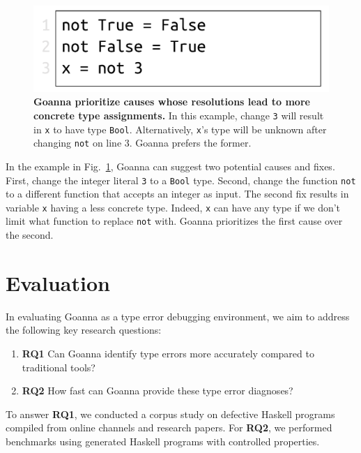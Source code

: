 \documentclass[pdflatex,lineno,sn-nature,Numbered]{sn-jnl}%
\begin{document}
	
   \begin{figure}[ht!]
        \centering
        \includegraphics[width=0.5\linewidth]{images/Specificity}
        \caption[Goanna prioritize causes whose resolutions lead to more concrete type assignments]{\textbf{Goanna prioritize causes whose resolutions lead to more concrete type assignments.} In this example, change \texttt{3} will result in \texttt{x} to have type \texttt{Bool}. Alternatively, \texttt{x}'s type will be unknown after changing \texttt{not} on line 3. Goanna prefers the former.} 
        \label{fig:specificity}
    \end{figure}

    In the example in Fig.~\ref{fig:specificity}, Goanna can suggest two potential causes and fixes. First, change the integer literal \texttt{3} to a \texttt{Bool} type. Second, change the function \texttt{not} to a different function that accepts an integer as input. The second fix results in variable \texttt{x} having a less concrete type. Indeed, \texttt{x} can have any type if we don't limit what function to replace \texttt{not} with. Goanna prioritizes the first cause over the second. 

    
       
\section{Evaluation} \label{sec:evaluation}

In evaluating Goanna as a type error debugging environment, we aim to address the following key research questions:

\begin{enumerate}
    \item \textbf{RQ1} Can Goanna identify type errors more accurately compared to traditional tools?
    \item \textbf{RQ2} How fast can Goanna provide these type error diagnoses?
\end{enumerate}

To answer {\bf RQ1}, we conducted a corpus study on defective Haskell programs compiled from online channels and research papers. For {\bf RQ2}, we performed benchmarks using generated Haskell programs with controlled properties.
\end{document}
